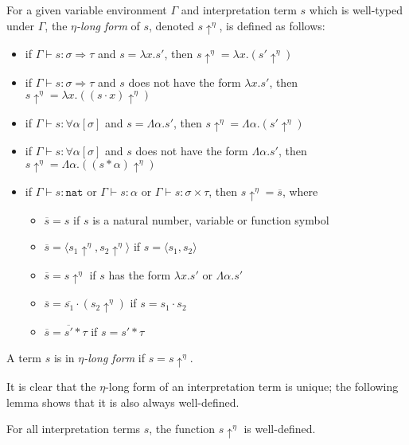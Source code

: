 \documentclass[runningheads,a4paper]{llncs}
\newcommand{\quant}[2]{\forall #1[#2]}
\newcommand{\arrtype}{\Rightarrow}
\newcommand{\abs}[2]{\lambda #1.#2}
\newcommand{\tabs}[2]{\Lambda #1.#2}
\newcommand{\app}[2]{#1 \cdot #2}
\newcommand{\tapp}[2]{#1 * #2}
\newcommand{\pair}[2]{\langle #1,#2 \rangle}
\newcommand{\etalong}[1]{#1\uparrow^\eta}
\newcommand{\almostetalong}[1]{\overline{#1}}
\newcommand{\nat}{\mathtt{nat}}
\begin{document}
\begin{definition}
For a given variable environment $\Gamma$ and interpretation term $s$
which is well-typed under $\Gamma$, the \emph{$\eta$-long form} of $s$,
denoted $\etalong{s}$, is defined as follows:
\begin{itemize}
\item if $\Gamma \vdash s : \sigma \arrtype \tau$ and $s = \abs{x}{s'}$,
  then $\etalong{s} =  \abs{x}{(\etalong{s'})}$
\item if $\Gamma \vdash s : \sigma \arrtype \tau$ and $s$ does not have
  the form $\abs{x}{s'}$, then $\etalong{s} =  \abs{x}{(
  \etalong{(\app{s}{x})})}$
\item if $\Gamma \vdash s : \quant{\alpha}{\sigma}$ and $s = \tabs{
  \alpha}{s'}$, then $\etalong{s} = \tabs{\alpha}{(\etalong{s'})}$
\item if $\Gamma \vdash s : \quant{\alpha}{\sigma}$ and $s$ does not have
  the form $\tabs{\alpha}{s'}$, then $\etalong{s} = \tabs{\alpha}{
  (\etalong{(\tapp{s}{\alpha})})}$
\item if $\Gamma \vdash s : \nat$ or $\Gamma \vdash s : \alpha$ or
  $\Gamma \vdash s : \sigma \times \tau$, then $\etalong{s} =
  \almostetalong{s}$, where
  \begin{itemize}
  \item $\almostetalong{s} = s$ if $s$ is a natural number, variable or
    function symbol
  \item $\almostetalong{s} = \pair{\etalong{s_1}}{\etalong{s_2}}$ if
    $s = \pair{s_1}{s_2}$
  \item $\almostetalong{s} = \etalong{s}$ if $s$ has the form
    $\abs{x}{s'}$ or $\tabs{\alpha}{s'}$
  \item $\almostetalong{s} = \app{\almostetalong{s_1}}{(\etalong{s_2})}$
    if $s = \app{s_1}{s_2}$
  \item $\almostetalong{s} = \tapp{\almostetalong{s'}}{\tau}$
    if $s = \tapp{s'}{\tau}$
  \end{itemize}
\end{itemize}
A term $s$ is in \emph{$\eta$-long form} if $s = \etalong{s}$.
\end{definition}

It is clear that the $\eta$-long form of an interpretation term is
unique; the following lemma shows that it is also always well-defined.

\begin{lemma}
For all interpretation terms $s$, the function $\etalong{s}$ is
well-defined.
\end{lemma}
\end{document}
